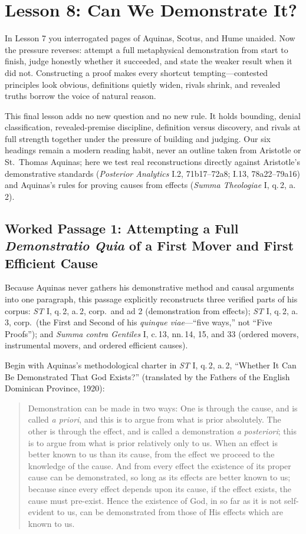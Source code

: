 \section{Lesson 8: Can We Demonstrate It?}

In Lesson 7 you interrogated pages of Aquinas, Scotus, and Hume unaided. Now the pressure reverses: attempt a full metaphysical demonstration from start to finish, judge honestly whether it succeeded, and state the weaker result when it did not. Constructing a proof makes every shortcut tempting---contested principles look obvious, definitions quietly widen, rivals shrink, and revealed truths borrow the voice of natural reason.

This final lesson adds no new question and no new rule. It holds bounding, denial classification, revealed-premise discipline, definition versus discovery, and rivals at full strength together under the pressure of building and judging. Our six headings remain a modern reading habit, never an outline taken from Aristotle or St.\ Thomas Aquinas; here we test real reconstructions directly against Aristotle's demonstrative standards (\emph{Posterior Analytics} I.2, 71b17--72a8; I.13, 78a22--79a16) and Aquinas's rules for proving causes from effects (\emph{Summa Theologiae} I, q.\,2, a.\,2).

\subsection{Worked Passage 1: Attempting a Full \emph{Demonstratio Quia} of a First Mover and First Efficient Cause}

Because Aquinas never gathers his demonstrative method and causal arguments into one paragraph, this passage explicitly reconstructs three verified parts of his corpus: \emph{ST} I, q.\,2, a.\,2, corp.\ and ad 2 (demonstration from effects); \emph{ST} I, q.\,2, a.\,3, corp.\ (the First and Second of his \emph{quinque viae}---``five ways,'' not ``Five Proofs''); and \emph{Summa contra Gentiles} I, c.\,13, nn.\,14, 15, and 33 (ordered movers, instrumental movers, and ordered efficient causes).

Begin with Aquinas's methodological charter in \emph{ST} I, q.\,2, a.\,2, ``Whether It Can Be Demonstrated That God Exists?'' (translated by the Fathers of the English Dominican Province, 1920):

\begin{quote}
Demonstration can be made in two ways: One is through the cause, and is called \emph{a priori}, and this is to argue from what is prior absolutely. The other is through the effect, and is called a demonstration \emph{a posteriori}; this is to argue from what is prior relatively only to us. When an effect is better known to us than its cause, from the effect we proceed to the knowledge of the cause. And from every effect the existence of its proper cause can be demonstrated, so long as its effects are better known to us; because since every effect depends upon its cause, if the effect exists, the cause must pre-exist. Hence the existence of God, in so far as it is not self-evident to us, can be demonstrated from those of His effects which are known to us.
\end{quote}

